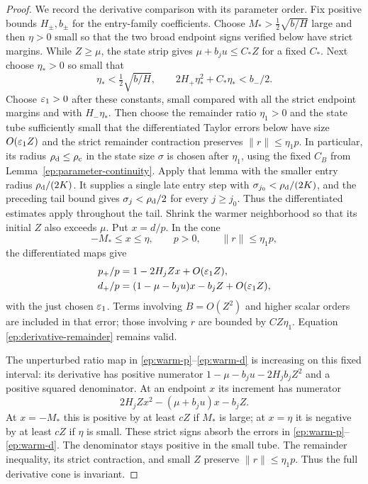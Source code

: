 \begin{proof}
We record the derivative comparison with its parameter
order.  Fix positive bounds $H_\pm,b_\pm$ for the entry-family
coefficients.  Choose $M_*>\tfrac12\sqrt{b/H}$ large and then $\eta>0$ small so that
the two broad endpoint signs verified below have strict margins.
While $Z\ge\mu$, the state strip gives
$\mu+b_ju\le C_*Z$ for a fixed $C_*$.  Next choose $\eta_*>0$
so small that
\[
 \eta_*<\tfrac12\sqrt{b/H},\qquad
 2H_+\eta_*^2+C_*\eta_*<b_-/2 .
\]
Choose $\varepsilon_1>0$ after these constants, small compared with all
the strict endpoint margins and with $H_-\eta_*$.  Then choose the
remainder ratio $\eta_1>0$ and the state tube sufficiently small
that the differentiated Taylor errors below have size
$O(\varepsilon_1Z)$ and the strict remainder contraction preserves
$\|r\|\le\eta_1p$.  In particular, its radius
$\rho_{\rm d}\le\rho_{\rm c}$ in the state size $\sigma$ is chosen
after $\eta_1$, using the fixed $C_B$ from
Lemma~\ref{ep:parameter-continuity}.  Apply that lemma with the
smaller entry radius $\rho_{\rm d}/(2K)$.  It supplies a single late
entry step with $\sigma_{j_0}<\rho_{\rm d}/(2K)$, and the preceding
tail bound gives $\sigma_j<\rho_{\rm d}/2$ for every $j\ge j_0$.
Thus the differentiated estimates apply throughout the tail.  Shrink
the warmer neighborhood so that its initial $Z$ also exceeds
$\mu$.  Put $x=d/p$.  In the cone
\[
 -M_*\le x\le\eta,\qquad p>0,\qquad \|r\|\le\eta_1p ,
\]
the differentiated maps give
\begin{align}
 p_+/p&=1-2H_jZx+O(\varepsilon_1Z),\label{ep:warm-p}\\
 d_+/p&=(1-\mu-b_ju)x-b_jZ+O(\varepsilon_1Z),\label{ep:warm-d}
\end{align}
with the just chosen $\varepsilon_1$.  Terms involving $B=O(Z^2)$ and higher scalar
orders are included in that error; those involving $r$
are bounded by $CZ\eta_1$.  Equation
\eqref{ep:derivative-remainder} remains valid.

The unperturbed ratio map in
\eqref{ep:warm-p}--\eqref{ep:warm-d} is increasing on this
fixed interval: its derivative has positive numerator
$1-\mu-b_ju-2H_jb_jZ^2$ and a positive squared denominator.
At an endpoint $x$ its increment has numerator
\begin{equation}\label{ep:ratio-numerator}
 2H_jZx^2-(\mu+b_ju)x-b_jZ .
\end{equation}
At $x=-M_*$ this is positive by at least $cZ$ if $M_*$
is large; at $x=\eta$ it is negative by at least $cZ$
if $\eta$ is small.  These strict signs absorb the errors
in \eqref{ep:warm-p}--\eqref{ep:warm-d}.
The denominator stays positive in the small tube.
The remainder inequality, its strict contraction, and
small $Z$ preserve $\|r\|\le\eta_1p$.
Thus the full derivative cone is invariant.


\end{proof}
